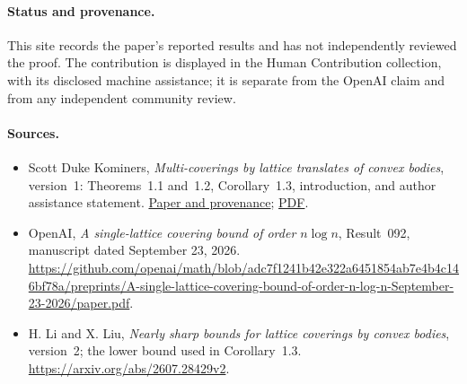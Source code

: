 \documentclass[11pt]{article}
\begin{document}
\paragraph{Status and provenance.}
This site records the paper's reported results and has not independently
reviewed the proof. The contribution is displayed in the Human Contribution
collection, with its disclosed machine assistance; it is separate from the
OpenAI claim and from any independent community review.

\paragraph{Sources.}
\begin{itemize}[leftmargin=*,nosep]
 \item Scott Duke Kominers, \emph{Multi-coverings by lattice translates of
       convex bodies}, version~1: Theorems~1.1 and~1.2, Corollary~1.3,
       introduction, and author assistance statement.
       \href{https://hexagonmath.org/2610.00165v1}{Paper and provenance};
       \href{https://hexagonmath.org/pdf/2610.00165v1}{PDF}.
 \item OpenAI, \emph{A single-lattice covering bound of order $n\log n$},
       Result~092, manuscript dated September 23, 2026.
       \url{https://github.com/openai/math/blob/adc7f1241b42e322a6451854ab7e4b4c146bf78a/preprints/A-single-lattice-covering-bound-of-order-n-log-n-September-23-2026/paper.pdf}.
 \item H. Li and X. Liu, \emph{Nearly sharp bounds for lattice coverings by
       convex bodies}, version~2; the lower bound used in Corollary~1.3.
       \url{https://arxiv.org/abs/2607.28429v2}.
\end{itemize}
\end{document}
